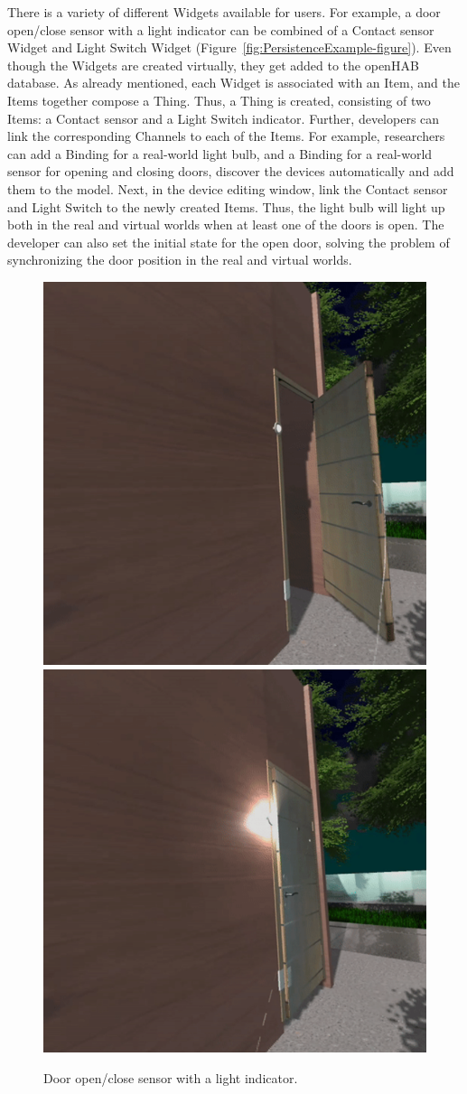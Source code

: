 There is a variety of different Widgets available for users. For example, a door open/close sensor with a light indicator can be combined of a Contact sensor Widget and Light Switch Widget (Figure~\ref{fig:PersistenceExample-figure}). Even though the Widgets are created virtually, they get added to the openHAB database. As already mentioned, each Widget is associated with an Item, and the Items together compose a Thing. Thus, a Thing is created, consisting of two Items: a Contact sensor and a Light Switch indicator. Further, developers can link the corresponding Channels to each of the Items. For example, researchers can add a Binding for a real-world light bulb, and a Binding for a real-world sensor for opening and closing doors, discover the devices automatically and add them to the model. Next, in the device editing window, link the Contact sensor and Light Switch to the newly created Items. Thus, the light bulb will light up both in the real and virtual worlds when at least one of the doors is open. The developer can also set the initial state for the open door, solving the problem of synchronizing the door position in the real and virtual worlds. 

\begin{figure}
  \centering
    {\includegraphics[width=0.45\linewidth]{figures/DoorOpen.png}}
    {\includegraphics[width=0.45\linewidth]{figures/DoorClose.png}}
  \caption{Door open/close sensor with a light indicator.}
  \label{fig:doorsensor}
\end{figure}

